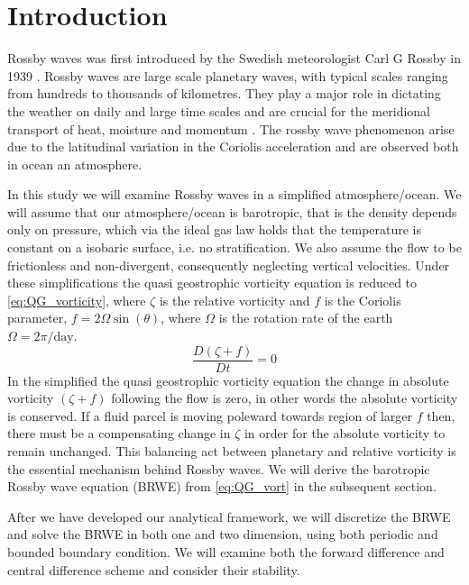 \section{Introduction}
Rossby waves was first introduced by the Swedish meteorologist
Carl G Rossby in 1939 \parencite{Rossby1939}. Rossby waves are large scale
planetary waves, with typical scales ranging from 
hundreds to thousands of kilometres. They play a major role in dictating
the weather on daily and large time scales and are crucial for the meridional
transport of heat, moisture and momentum \parencite{midSynDyn}. The rossby wave phenomenon arise due to the
latitudinal variation in the Coriolis acceleration and are observed both in
ocean an atmosphere. 

In this study we will examine Rossby waves in a simplified 
atmosphere/ocean. We will assume that our atmosphere/ocean is barotropic, that
is the density depends only on pressure, which via the ideal gas law holds that
the temperature is constant on a isobaric surface, i.e. no stratification. We also assume the flow to be frictionless and
non-divergent, consequently neglecting vertical velocities. Under these
simplifications the quasi geostrophic vorticity equation is reduced to
\cref{eq:QG_vorticity}, where $\zeta$ is the relative vorticity and $f$ is the
Coriolis parameter, $f=2\Omega \sin(\theta)$, where $\Omega$ is
the rotation rate of the earth $\Omega = 2\pi/ \mathrm{day}$.
\begin{equation}\label{eq:QG_vorticity}
    \frac{D(\zeta + f)}{Dt} = 0
\end{equation}
In the simplified the quasi geostrophic vorticity equation the
change in absolute vorticity $(\zeta + f)$ following the flow is zero, in other
words the absolute vorticity is conserved. If a fluid parcel is moving
poleward towards region of larger $f$ then, there must be a compensating change
in $\zeta$ in order for the absolute vorticity to remain unchanged. This
balancing act between planetary and relative vorticity is the essential
mechanism behind
Rossby waves. We will derive the barotropic Rossby
wave equation (BRWE) from \cref{eq:QG_vort} in the subsequent section.

After we have developed our analytical framework, we will discretize the BRWE
and solve the BRWE in both one and two dimension, using both periodic and
bounded boundary condition. We will examine both the forward
difference and central difference scheme and consider their stability. 
